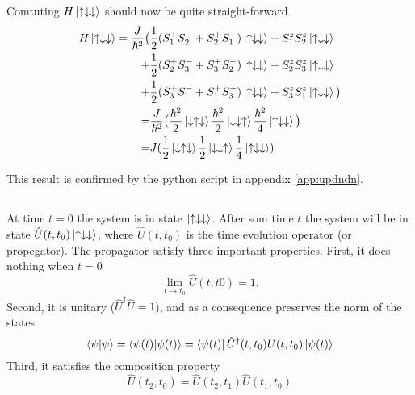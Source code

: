 \documentclass{article}
\begin{document}
Comtuting $H\ket{\uparrow\downarrow\downarrow}$ should now be quite straight-forward.
\begin{align*}
H\ket{\uparrow\downarrow\downarrow} = 
\frac{J}{\hbar^2} \big(&\frac{1}{2} (S_1^+S_2^- + S_2^+S_1^-)\ket{\uparrow\downarrow\downarrow} + S_1^zS_2^z\ket{\uparrow\downarrow\downarrow} \\
+&\frac{1}{2}(S_2^+S_3^- + S_3^+S_2^-)\ket{\uparrow\downarrow\downarrow} + S_2^zS_3^z\ket{\uparrow\downarrow\downarrow} \\
+&\frac{1}{2}(S_3^+S_1^- + S_1^+S_3^-)\ket{\uparrow\downarrow\downarrow} + S_3^zS_1^z\ket{\uparrow\downarrow\downarrow} \big)\\
=&\frac{J}{\hbar^2}\big(
\frac{\hbar^2}{2}\ket{\downarrow\uparrow\downarrow} 
\frac{\hbar^2}{2}\ket{\downarrow\downarrow\uparrow} 
\frac{\hbar^2}{4}\ket{\uparrow\downarrow\downarrow} 
\big) \\
=&J(
\frac{1}{2}\ket{\downarrow\uparrow\downarrow} 
\frac{1}{2}\ket{\downarrow\downarrow\uparrow} 
\frac{1}{4}\ket{\uparrow\downarrow\downarrow})
\end{align*}

This result is confirmed by the python script in appendix \ref{app:updndn}.

\subsection{}

\subsection{}

\subsection{}

\subsection{}
At time $t=0$ the system is in state $\ket{\uparrow\downarrow\downarrow}$. After som time $t$ the system will be in state $\hat{U}(t,t_0)\ket{\uparrow\downarrow\downarrow}$, where $\hat{U}(t,t_0)$ is the time evolution operator (or propegator). The propagator satisfy three important properties. First, it does nothing when $t=0$
\begin{equation}
\lim_{t\to t_0}\hat{U}(t,t0)=1.
\end{equation}
Second, it is unitary ($\hat{U}^{\dagger}\hat{U}=1$), and as a consequence preserves the norm of the states
\begin{equation}
\braket{\psi} = \braket{\psi(t)} = \bra{\psi(t)} \hat{U}^{\dagger}(t,t_0){U}(t,t_0) \ket{\psi(t)}
\end{equation}
Third, it satisfies the composition property
\begin{equation}
\hat{U}(t_2,t_0)=\hat{U}(t_2,t_1)\hat{U}(t_1,t_0)
\end{equation}
\end{document}
